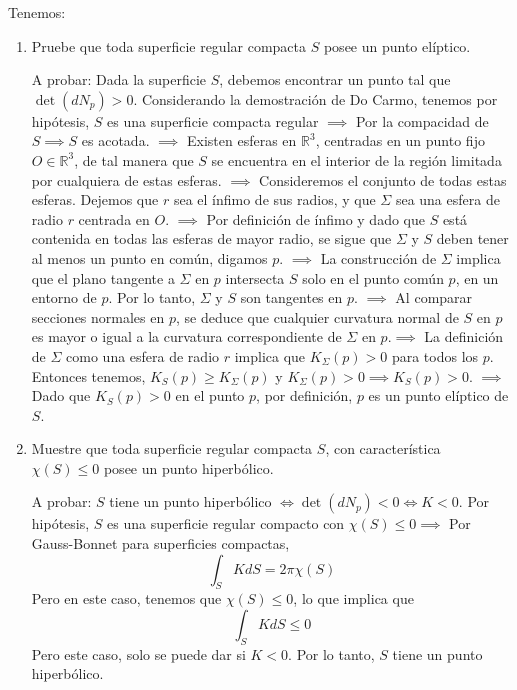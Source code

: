 







\begin{problema}
    Tenemos: 
    \begin{enumerate}
        \item Pruebe que toda superficie regular compacta $S$ posee un punto elíptico.
        \begin{dem}
            A probar: Dada la superficie $S$, debemos encontrar un punto tal que $\det(dN_p)>0$. Considerando la demostración de Do Carmo, tenemos por hipótesis, $S$ es una superficie compacta regular $\implies$ Por la compacidad de $S\implies S$ es acotada. $\implies$ Existen esferas en $\mathbb{R}^3$, centradas en un punto fijo $O \in \mathbb{R}^3$, de tal manera que $S$ se encuentra en el interior de la región limitada por cualquiera de estas esferas. $\implies$ Consideremos el conjunto de todas estas esferas. Dejemos que $r$ sea el ínfimo de sus radios, y que $\Sigma$ sea una esfera de radio $r$ centrada en $O$.
            $\implies$ Por definición de ínfimo y dado que $S$ está contenida en todas las esferas de mayor radio, se sigue que $\Sigma$ y $S$ deben tener al menos un punto en común, digamos $p$. $\implies$ La construcción de $\Sigma$ implica que el plano tangente a $\Sigma$ en $p$ intersecta $S$ solo en el punto común $p$, en un entorno de $p$. Por lo tanto, $\Sigma$ y $S$ son tangentes en $p$. $\implies$ Al comparar secciones normales en $p$, se deduce que cualquier curvatura normal de $S$ en $p$ es mayor o igual a la curvatura correspondiente de $\Sigma$ en $p$.$\implies$ La definición de $\Sigma$ como una esfera de radio $r$ implica que $K_{\Sigma}(p) > 0$ para todos los $p$. Entonces tenemos, $K_S(p) \geq K_{\Sigma}(p)$ y $K_{\Sigma}(p) > 0\implies K_S(p) > 0$. $\implies$ Dado que $K_S(p) > 0$ en el punto $p$, por definición, $p$ es un punto elíptico de $S$.
        \end{dem}
        \item Muestre que toda superficie regular compacta $S$, con característica $\chi(S) 
        \leq 0$ posee un punto hiperbólico.
        \begin{dem}
            A probar: $S$ tiene un punto hiperbólico $\iff \det(dN_p)<0\iff K<0$. Por hipótesis, $S$ es una superficie regular compacto con $\chi(S)\leq 0\implies$ Por Gauss-Bonnet para superficies compactas,
            $$\int_S KdS=2\pi \chi(S)$$
            Pero en este caso, tenemos que $\chi(S)\leq 0$, lo que implica que 
            $$\int_S KdS\leq 0$$
            Pero este caso, solo se puede dar si $K<0$. Por lo tanto, $S$ tiene un punto hiperbólico. 
        \end{dem}
    \end{enumerate}
\end{problema}

